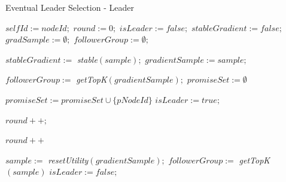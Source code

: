 \documentclass[a4paper,11pt]{kth-mag}
\begin{document}
\begin{algorithm}[h]
\caption{Eventual Leader Selection - Leader}
\label{leader}
\begin{algorithmic}[1]
  \State $selfId := nodeId;$ $round := 0;$
  \State $isLeader := false;$ $stableGradient := false;$
  \State $gradSample := \emptyset;$ $followerGroup := \emptyset;$
  \TriggerS[periodicCheck]{}\EndTriggerS
 \EndUpon

  \State $stableGradient := $ \emph{stable}$(sample);$
  \State $gradientSample := sample;$
 \EndUpon

\UponS[periodicCheck]{}
     \State $followerGroup := $ \emph{getTopK}$(gradientSample);$
        \EndTrigger
    \EndForEach
    \TriggerS[roundTimeout]{} \EndTriggerS
    \State $promiseSet := \emptyset$
  \EndIf
 \EndUponS

    \State $promiseSet := promiseSet \cup \{pNodeId\}$
        \EndTrigger
      \EndForEach
      \State $isLeader := true;$
      \TriggerS[leaseTimeout]{}\EndTriggerS
      \TriggerS[cancelRoundTimeout]{}\EndTriggerS
    \EndIf
  \EndIf
\EndUpon


\end{algorithmic}
\end{algorithm}


\begin{algorithm}
\begin{algorithmic}[1]

    \State $round++;$
    \TriggerS[cancelRoundTimeout]{}\EndTriggerS
  \EndIf
\EndUpon

\UponS[roundTimeout]{}
  \State $round++$
\EndUponS

\UponS[leaseTimeout]{}
  \State $sample := $ \emph{resetUtility}$(gradientSample);$
    \State $followerGroup := $ \emph{getTopK}$(sample)$
       \EndTrigger
    \EndForEach
    \TriggerS[leaseTimeout]{}\EndTriggerS
  \Else
    \State $isLeader := false;$
  \EndIf
\EndUponS

\end{algorithmic}
\end{algorithm}
\end{document}
